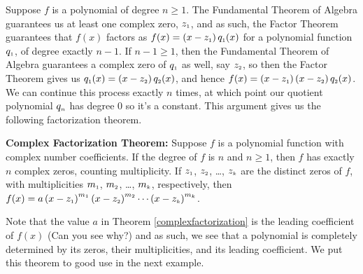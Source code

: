 \smallskip

Suppose  $f$ is a polynomial of degree $n \geq 1$.  The Fundamental Theorem of Algebra guarantees us at least one complex zero, $z_{\mbox{\tiny $1$}}$, and as such, the Factor Theorem guarantees that $f(x)$ factors as $f(x) = \left(x - z_{\mbox{\tiny $1$}}\right) q_{\mbox{\tiny $1$}}(x)$ for a polynomial function $q_{\mbox{\tiny $1$}}$,  of degree exactly $n-1$.  If $n-1 \geq 1$, then the Fundamental Theorem of Algebra guarantees a complex zero of $q_{\mbox{\tiny $1$}}$ as well, say $z_{\mbox{\tiny $2$}}$, so then the Factor Theorem gives us $q_{\mbox{\tiny $1$}}(x) = \left(x - z_{\mbox{\tiny $2$}}\right) q_{\mbox{\tiny $2$}}(x)$, and hence $f(x) = \left(x - z_{\mbox{\tiny $1$}}\right) \left(x - z_{\mbox{\tiny $2$}}\right) q_{\mbox{\tiny $2$}}(x)$.  We can continue this process exactly $n$ times, at which point our quotient polynomial $q_{\mbox{\tiny $n$}}$ has degree $0$ so it's a constant.  This argument gives us the following factorization theorem.

\smallskip

\colorbox{ResultColor}{\bbm
\begin{thm} \label{complexfactorization} \textbf{Complex Factorization Theorem:} Suppose $f$ is a polynomial function with complex number coefficients.  If the degree of $f$ is $n$ and $n \geq 1$, then  $f$ has exactly $n$ complex zeros, counting multiplicity.  If $z_{\mbox{\tiny $1$}}$, $z_{\mbox{\tiny $2$}}$, \ldots, $z_{\mbox{\tiny $k$}}$ are the distinct zeros of $f$, with multiplicities $m_{\mbox{\tiny $1$}}$, $m_{\mbox{\tiny $2$}}$, \ldots, $m_{\mbox{\tiny $k$}}$, respectively, then $f(x) = a\left(x - z_{\mbox{\tiny $1$}}  \right)^{m_{\mbox{\tiny $1$}}}\left(x - z_{\mbox{\tiny $2$}}  \right)^{m_{\mbox{\tiny $2$}}} \cdots \left(x - z_{\mbox{\tiny $k$}}  \right)^{m_{\mbox{\tiny $k$}}}$. 

\end{thm}
\ebm}

\smallskip

Note that the value $a$ in Theorem \ref{complexfactorization} is the leading coefficient of $f(x)$ (Can you see why?) and as such, we see that a polynomial is completely determined by its zeros, their multiplicities, and its leading coefficient.  We put this theorem to good use in the next example.


